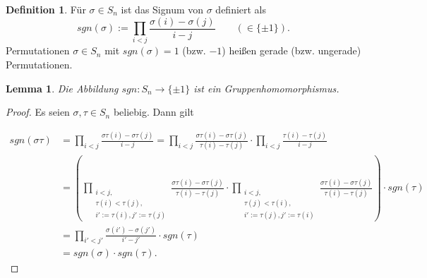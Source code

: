 \documentclass[12pt]{scrartcl}%
\newtheorem{lemma}{Lemma}
\theoremstyle{definition}
\newtheorem*{defn}{Definition}
\theoremstyle{remark}
\begin{document}
\begin{defn}
Für $\sigma\in S_n$ ist das Signum von $\sigma$ definiert als
    \[sgn(\sigma) := \prod_{i<j}\frac{\sigma(i)-\sigma(j)}{i-j}\qquad(\in\{\pm 1\}).\]
Permutationen $\sigma\in S_n$ mit $sgn(\sigma) = 1$ (bzw. $-1$) heißen gerade (bzw. ungerade) Permutationen.
\end{defn}

\begin{lemma}
Die Abbildung $sgn:S_n\to\{\pm 1\}$ ist ein Gruppenhomomorphismus.
\end{lemma}

\begin{proof}
Es seien $\sigma,\tau\in S_n$ beliebig. Dann gilt 

\begin{equation*}
    \begin{split}
        sgn(\sigma\tau) &= \prod_{i<j}\frac{\sigma\tau(i)-\sigma\tau(j)}{i-j} = \prod_{i<j}\frac{\sigma\tau(i)-\sigma\tau(j)}{\tau(i)-\tau(j)}\cdot\prod_{i<j}\frac{\tau(i)-\tau(j)}{i-j} \\
        &= \left(\prod_{\substack{i<j,\\\tau(i)<\tau(j),\\ i':=\tau(i),j':=\tau(j)}}\frac{\sigma\tau(i)-\sigma\tau(j)}{\tau(i)-\tau(j)}\cdot \prod_{\substack{i<j,\\\tau(j)<\tau(i),\\ i':=\tau(j),j':=\tau(i)}}\frac{\sigma\tau(i)-\sigma\tau(j)}{\tau(i)-\tau(j)}\right)\cdot sgn(\tau) \\
        &=\prod_{i'<j'}\frac{\sigma(i')-\sigma(j')}{i'-j'}\cdot sgn(\tau) \\
        &= sgn(\sigma)\cdot sgn(\tau).
    \end{split}
\end{equation*}
\end{proof}






 
\end{document}
